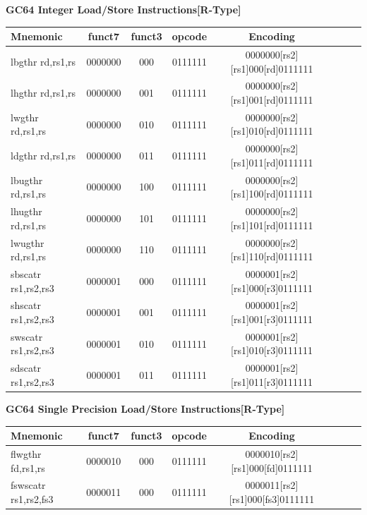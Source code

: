 \documentclass{article}
\begin{document}
\begin{center}
\begin{small}
\textbf{GC64 Integer Load/Store Instructions[R-Type]}
\begin{tabular}{| l | c | c | c | c | c | c || r}
\hline
Mnemonic & funct7 & funct3 & opcode & Encoding \\ \hline
\hline
lbgthr rd,rs1,rs & 0000000 & 000 & 0111111 & 0000000[rs2][rs1]000[rd]0111111 \\ 
\hline
lhgthr rd,rs1,rs & 0000000 & 001 & 0111111 & 0000000[rs2][rs1]001[rd]0111111 \\ 
\hline
lwgthr rd,rs1,rs & 0000000 & 010 & 0111111 & 0000000[rs2][rs1]010[rd]0111111 \\ 
\hline
ldgthr rd,rs1,rs & 0000000 & 011 & 0111111 & 0000000[rs2][rs1]011[rd]0111111 \\ 
\hline
lbugthr rd,rs1,rs & 0000000 & 100 & 0111111 & 0000000[rs2][rs1]100[rd]0111111 \\ 
\hline
lhugthr rd,rs1,rs & 0000000 & 101 & 0111111 & 0000000[rs2][rs1]101[rd]0111111 \\ 
\hline
lwugthr rd,rs1,rs & 0000000 & 110 & 0111111 & 0000000[rs2][rs1]110[rd]0111111 \\ 
\hline
sbscatr rs1,rs2,rs3 & 0000001 & 000 & 0111111 & 0000001[rs2][rs1]000[r3]0111111 \\ 
\hline
shscatr rs1,rs2,rs3 & 0000001 & 001 & 0111111 & 0000001[rs2][rs1]001[r3]0111111 \\ 
\hline
swscatr rs1,rs2,rs3 & 0000001 & 010 & 0111111 & 0000001[rs2][rs1]010[r3]0111111 \\ 
\hline
sdscatr rs1,rs2,rs3 & 0000001 & 011 & 0111111 & 0000001[rs2][rs1]011[r3]0111111 \\ 
\hline
\end{tabular}

\vspace{10 mm}

\textbf{GC64 Single Precision Load/Store Instructions[R-Type]}
\begin{tabular}{| l | c | c | c | c | c | c || r}
\hline
Mnemonic & funct7 & funct3 & opcode & Encoding \\ \hline
\hline
flwgthr fd,rs1,rs & 0000010 & 000 & 0111111 & 0000010[rs2][rs1]000[fd]0111111 \\ 
\hline
fswscatr rs1,rs2,fs3 & 0000011 & 000 & 0111111 & 0000011[rs2][rs1]000[fs3]0111111 \\ 
\hline
\end{tabular}

\vspace{10 mm}


\end{small}
\end{center}
\end{document}
